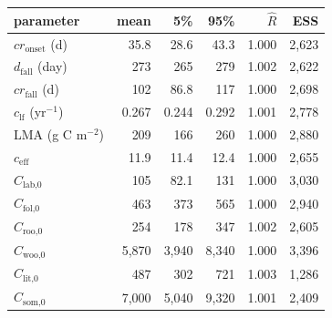 \begin{tabular}[t]{lrrrrr}
\toprule
parameter & mean & 5\% & 95\% & $\hat R$ & ESS \\
\midrule
$cr_\text{onset}$ (d) & 35.8 & 28.6 & 43.3 & 1.000 & 2,623 \\
$d_\text{fall}$ (day) & 273 & 265 & 279 & 1.002 & 2,622 \\
$cr_\text{fall}$ (d) & 102 & 86.8 & 117 & 1.000 & 2,698 \\
$c_\text{lf}$ (yr$^{-1}$) & 0.267 & 0.244 & 0.292 & 1.001 & 2,778 \\
LMA (g C m$^{-2}$) & 209 & 166 & 260 & 1.000 & 2,880 \\
$c_\text{eff}$ & 11.9 & 11.4 & 12.4 & 1.000 & 2,655 \\
$C_\text{lab,0}$ & 105 & 82.1 & 131 & 1.000 & 3,030 \\
$C_\text{fol,0}$ & 463 & 373 & 565 & 1.000 & 2,940 \\
$C_\text{roo,0}$ & 254 & 178 & 347 & 1.002 & 2,605 \\
$C_\text{woo,0}$ & 5,870 & 3,940 & 8,340 & 1.000 & 3,396 \\
$C_\text{lit,0}$ & 487 & 302 & 721 & 1.003 & 1,286 \\
$C_\text{som,0}$ & 7,000 & 5,040 & 9,320 & 1.001 & 2,409 \\
\bottomrule
\end{tabular}

